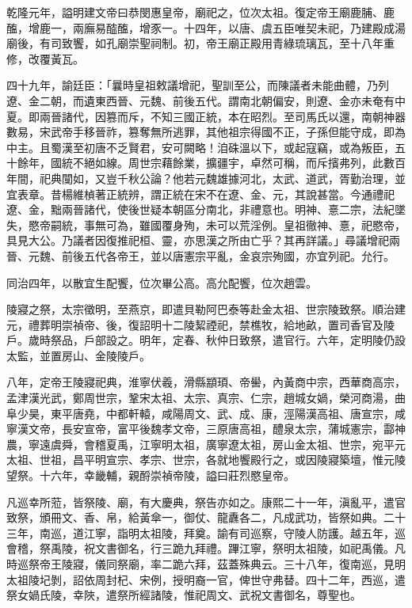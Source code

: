 \begin{pinyinscope}
乾隆元年，謚明建文帝曰恭閔惠皇帝，廟祀之，位次太祖。復定帝王廟鹿脯、鹿醢，增鹿一，兩廡易醓醢，增豕一。十四年，以唐、虞五臣唯契未祀，乃建殿成湯廟後，有司致饗，如孔廟崇聖祠制。初，帝王廟正殿用青綠琉璃瓦，至十八年重修，改覆黃瓦。

四十九年，諭廷臣：「曩時皇祖敕議增祀，聖訓至公，而陳議者未能曲體，乃列遼、金二朝，而遺東西晉、元魏、前後五代。謂南北朝偏安，則遼、金亦未奄有中夏。即兩晉諸代，因篡而斥，不知三國正統，本在昭烈。至司馬氏以還，南朝神器數易，宋武帝手移晉祚，篡奪無所逃罪，其他祖宗得國不正，子孫但能守成，即為中主。且蜀漢至初唐不乏賢君，安可闕略！洎硃溫以下，或起寇竊，或為叛臣，五十餘年，國統不絕如線。周世宗藉餘業，擴疆宇，卓然可稱，而斥擯弗列，此數百年間，祀典闃如，又豈千秋公論？他若元魏雄據河北，太武、道武，胥勤治理，並宜表章。昔楊維楨著正統辨，謂正統在宋不在遼、金、元，其說甚當。今通禮祀遼、金，黜兩晉諸代，使後世疑本朝區分南北，非禮意也。明神、憙二宗，法紀墜失，愍帝嗣統，事無可為，雖國覆身殉，未可以荒淫例。皇祖徹神、憙，祀愍帝，具見大公。乃議者因復推祀桓、靈，亦思漢之所由亡乎？其再詳議。」尋議增祀兩晉、元魏、前後五代各帝王，並以唐憲宗平亂，金哀宗殉國，亦宜列祀。允行。

同治四年，以散宜生配饗，位次畢公高。高允配饗，位次趙雲。

陵寢之祭，太宗徵明，至燕京，即遣貝勒阿巴泰等赴金太祖、世宗陵致祭。順治建元，禮葬明崇禎帝、後，復詔明十二陵絜禋祀，禁樵牧，給地畝，置司香官及陵戶。歲時祭品，戶部設之。明年，定春、秋仲日致祭，遣官行。六年，定明陵仍設太監，並置房山、金陵陵戶。

八年，定帝王陵寢祀典，淮寧伏羲，滑縣顓頊、帝嚳，內黃商中宗，西華商高宗，孟津漢光武，鄭周世宗，鞏宋太祖、太宗、真宗、仁宗，趙城女媧，榮河商湯，曲阜少昊，東平唐堯，中都軒轅，咸陽周文、武、成、康，涇陽漢高祖、唐宣宗，咸寧漢文帝，長安宣帝，富平後魏孝文帝，三原唐高祖，醴泉太宗，蒲城憲宗，酃神農，寧遠虞舜，會稽夏禹，江寧明太祖，廣寧遼太祖，房山金太祖、世宗，宛平元太祖、世祖，昌平明宣宗、孝宗、世宗，各就地饗殿行之，或因陵寢築壇，惟元陵望祭。十六年，幸畿輔，親酹崇禎帝陵，謚曰莊烈愍皇帝。

凡巡幸所蒞，皆祭陵、廟，有大慶典，祭告亦如之。康熙二十一年，滇亂平，遣官致祭，頒冊文、香、帛，給黃傘一，御仗、龍纛各二，凡成武功，皆祭如典。二十三年，南巡，道江寧，詣明太祖陵，拜奠。諭有司巡察，守陵人防護。越五年，巡會稽，祭禹陵，祝文書御名，行三跪九拜禮。蹕江寧，祭明太祖陵，如祀禹儀。凡時巡祭帝王陵寢，儀同祭廟，率二跪六拜，茲蓋殊典云。三十八年，復南巡，見明太祖陵圮剝，詔依周封杞、宋例，授明裔一官，俾世守弗替。四十二年，西巡，遣祭女媧氏陵，幸陜，遣祭所經諸陵，惟祀周文、武祝文書御名，尊聖也。


\end{pinyinscope}
